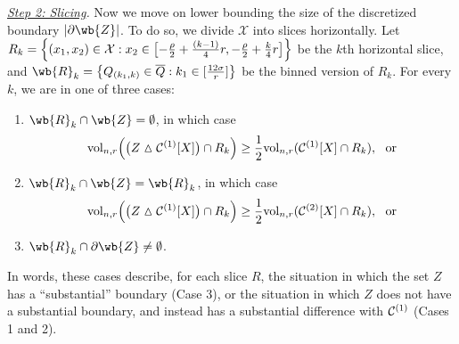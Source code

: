 	\emph{\underline{Step 2: Slicing}.}
	Now we move on lower bounding the size of the discretized boundary $\abs{\partial\wb{Z}}$. To do so, we divide $\mathcal{X}$ into slices horizontally. Let $R_k = \left\{(x_1,x_2) \in \mathcal{X}: x_2 \in \bigl[-\frac{\rho}{2} + \frac{(k - 1)}{4}r, -\frac{\rho}{2} + \frac{k}{4}r\bigr]\right\}$ be the $k$th horizontal slice, and $\wb{R}_k = \set{Q_{(k_1,k)} \in \overline{Q}:k_1 \in [\frac{12\sigma}{r}]}$ be the binned version of $R_k$. For every $k$, we are in one of three cases:
	\begin{enumerate}
		\item $\wb{R}_k \cap \wb{Z} = \emptyset$, in which case
		\begin{equation*}
		\mathrm{vol}_{n,r}\Bigl( \bigl(Z \vartriangle \mathcal{C}^{(1)}[X]\bigr) \cap R_k \Bigr) \geq \frac{1}{2}\mathrm{vol}_{n,r}(\mathcal{C}^{(1)}[X] \cap R_k), ~~ \textrm{or}
		\end{equation*}
		\item $\wb{R}_k \cap \wb{Z} = \wb{R}_k$, in which case
		\begin{equation*}
		\mathrm{vol}_{n,r}\Bigl( \bigl(Z \vartriangle \mathcal{C}^{(1)}[X]\bigr) \cap R_k \Bigr) \geq \frac{1}{2}\mathrm{vol}_{n,r}(\mathcal{C}^{(2)}[X] \cap R_k), ~~\textrm{or}
		\end{equation*}
		\item $\wb{R}_k \cap \partial \wb{Z} \neq \emptyset$.
	\end{enumerate}
	In words, these cases describe, for each slice $R$, the situation in which the set $Z$ has a ``substantial'' boundary (Case 3), or the situation in which $Z$ does not have a substantial boundary, and instead has a substantial difference with $\mathcal{C}^{(1)}$ (Cases 1 and 2). 
	
